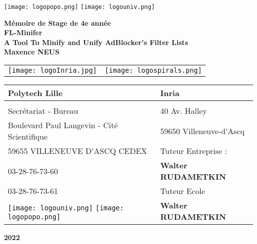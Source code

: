 \documentclass[oneside,a4paper,12pt]{article}
\begin{document}
	\begin{titlepage}
		\texttt{[image: logopopo.png]}
		\hspace*{\fill}
		\texttt{[image: logouniv.png]}
		
		\begin{center}
			\vspace{1cm}
			\textbf{Mémoire de Stage de 4e année}\\
			\vspace{1cm}
			\textbf{FL-Minifer}\\
			\textbf{A Tool To Minify and Unify AdBlocker’s Filter Lists}\\
			\vspace{1cm}
			\textbf{Maxence NEUS}\\
			\vspace{1cm}
			\begin{tabular}{ c c }
				\texttt{[image: logoInria.jpg]} & \texttt{[image: logospirals.png]}\\
			\end{tabular}

			\vspace{2cm}

			\begin{tabular}{ m{6cm} | m{6cm} }
				\textbf{Polytech Lille} & \textbf{Inria} \\
				\hline
				& \\
				Secrétariat - Bureau & 40 Av. Halley \\
				Boulevard Paul Langevin - Cité Scientifique & 59650 Villeneuve-d'Ascq \\
				59655 VILLENEUVE D’ASCQ CEDEX & Tuteur Entreprise : \\
				03-28-76-73-60 & \textbf{Walter RUDAMETKIN} \\
				03-28-76-73-61 & Tuteur Ecole \\
				\texttt{[image: logouniv.png]} \texttt{[image: logopopo.png]} & \textbf{Walter RUDAMETKIN} \\
				
			\end{tabular}
			
			\vspace{\fill}
			\textbf{2022}\\
		\end{center}
	\end{titlepage}

\tableofcontents
\end{document}
